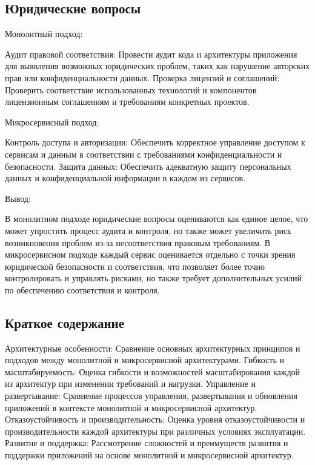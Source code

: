 \subsection{Юридические вопросы}

Монолитный подход:

    Аудит правовой соответствия: Провести аудит кода и архитектуры приложения для выявления возможных юридических проблем, таких как нарушение авторских прав или конфиденциальности данных.
    Проверка лицензий и соглашений: Проверить соответствие использованных технологий и компонентов лицензионным соглашениям и требованиям конкретных проектов.

Микросервисный подход:

    Контроль доступа и авторизации: Обеспечить корректное управление доступом к сервисам и данным в соответствии с требованиями конфиденциальности и безопасности.
    Защита данных: Обеспечить адекватную защиту персональных данных и конфиденциальной информации в каждом из сервисов.

Вывод:

    В монолитном подходе юридические вопросы оцениваются как единое целое, что может упростить процесс аудита и контроля, но также может увеличить риск возникновения проблем из-за несоответствия правовым требованиям.
    В микросервисном подходе каждый сервис оценивается отдельно с точки зрения юридической безопасности и соответствия, что позволяет более точно контролировать и управлять рисками, но также требует дополнительных усилий по обеспечению соответствия и контроля.














    \subsection{Краткое содержание}
    Архитектурные особенности: Сравнение основных архитектурных принципов и подходов между монолитной и микросервисной архитектурами.
    Гибкость и масштабируемость: Оценка гибкости и возможностей масштабирования каждой из архитектур при изменении требований и нагрузки.
    Управление и развертывание: Сравнение процессов управления, развертывания и обновления приложений в контексте монолитной и микросервисной архитектур.
    Отказоустойчивость и производительность: Оценка уровня отказоустойчивости и производительности каждой архитектуры при различных условиях эксплуатации.
    Развитие и поддержка: Рассмотрение сложностей и преимуществ развития и поддержки приложений на основе монолитной и микросервисной архитектур.


